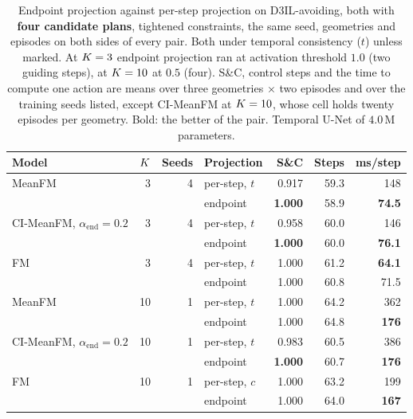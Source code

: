 \begin{table}[htpb]
  \caption[Endpoint against per-step projection at matched candidates]{Endpoint projection
  \parencite{li2025hardflow} against per-step projection on D3IL-avoiding, both with \textbf{four
  candidate plans}, tightened constraints, the same seed, geometries and episodes on both sides of every
  pair. Both under temporal consistency ($t$) unless marked. At $\nfe=3$ endpoint projection ran at activation threshold $1.0$ (two guiding
  steps), at $\nfe=10$ at $0.5$ (four). S\&C, control steps and the time to compute one action are means
  over three geometries $\times$ two episodes and over the training seeds listed, except CI-MeanFM at
  $\nfe=10$, whose cell holds twenty episodes per geometry. Bold: the better of the pair. Temporal U-Net of
  $4.0$\,M parameters.}
  \label{tab:avoiding-projectors}
  \centering
  \footnotesize
  \setlength{\tabcolsep}{4pt}
  \begin{tabularx}{\linewidth}{@{}L r r L rrr@{}}
    \toprule
    Model & $K$ & Seeds & Projection & S\&C & Steps & ms/step \\
    \midrule
    MeanFM    & 3  & 4 & per-step, $t$ & 0.917 & 59.3 & 148 \\
              &    &       & endpoint      & \textbf{1.000} & 58.9 & \textbf{74.5} \\
    CI-MeanFM, $\alpha_{\mathrm{end}}=0.2$ & 3 & 4 & per-step, $t$ & 0.958 & 60.0 & 146 \\
              &    &       & endpoint      & \textbf{1.000} & 60.0 & \textbf{76.1} \\
    FM        & 3  & 4     & per-step, $t$ & 1.000 & 61.2 & \textbf{64.1} \\
              &    &       & endpoint      & 1.000 & 60.8 & 71.5 \\
    \midrule
    MeanFM    & 10 & 1     & per-step, $t$ & 1.000 & 64.2 & 362 \\
              &    &       & endpoint      & 1.000 & 64.8 & \textbf{176} \\
    CI-MeanFM, $\alpha_{\mathrm{end}}=0.2$ & 10 & 1 & per-step, $t$ & 0.983 & 60.5 & 386 \\
              &    &       & endpoint      & \textbf{1.000} & 60.7 & \textbf{176} \\
    FM        & 10 & 1     & per-step, $c$ & 1.000 & 63.2 & 199 \\
              &    &       & endpoint      & 1.000 & 64.0 & \textbf{167} \\
    \bottomrule
  \end{tabularx}
\end{table}
